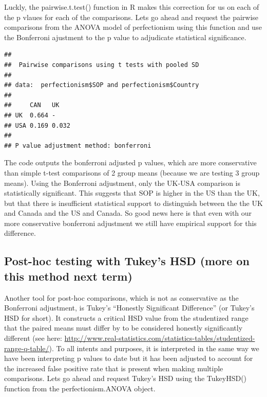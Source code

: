 \documentclass[
]{article}
\newenvironment{Shaded}{\begin{snugshade}}{\end{snugshade}}
\newcommand{\AttributeTok}[1]{\textcolor[rgb]{0.13,0.29,0.53}{#1}}
\newcommand{\CommentTok}[1]{\textcolor[rgb]{0.56,0.35,0.01}{\textit{#1}}}
\newcommand{\FunctionTok}[1]{\textcolor[rgb]{0.13,0.29,0.53}{\textbf{#1}}}
\newcommand{\NormalTok}[1]{#1}
\newcommand{\SpecialCharTok}[1]{\textcolor[rgb]{0.81,0.36,0.00}{\textbf{#1}}}
\newcommand{\StringTok}[1]{\textcolor[rgb]{0.31,0.60,0.02}{#1}}
\begin{document}
Luckly, the pairwise.t.test() function in R makes this correction for us
on each of the p vlaues for each of the comparisons. Lets go ahead and
request the pairwise comparisons from the ANOVA model of perfectionism
using this function and use the Bonferroni ajustment to the p value to
adjudicate statistical significance.

\begin{Shaded}
\end{Shaded}

\begin{verbatim}
## 
##  Pairwise comparisons using t tests with pooled SD 
## 
## data:  perfectionism$SOP and perfectionism$Country 
## 
##     CAN   UK   
## UK  0.664 -    
## USA 0.169 0.032
## 
## P value adjustment method: bonferroni
\end{verbatim}

The code outputs the bonferroni adjusted p values, which are more
conservative than simple t-test comparisons of 2 group means (because we
are testing 3 group means). Using the Bonferroni adjustment, only the
UK-USA comparison is statistically significant. This suggests that SOP
is higher in the US than the UK, but that there is insufficient
statistical support to distinguish between the the UK and Canada and the
US and Canada. So good news here is that even with our more conservative
bonferroni adjustment we still have empirical support for this
difference.

\subsection{Post-hoc testing with Tukey's HSD (more on this method next
term)}\label{post-hoc-testing-with-tukeys-hsd-more-on-this-method-next-term}

Another tool for post-hoc comparisons, which is not as conservative as
the Bonferroni adjustment, is Tukey's ``Honestly Significant
Difference'' (or Tukey's HSD for short). It constructs a critical HSD
value from the studentized range that the paired means must differ by to
be considered honestly significantly different (see here:
\url{http://www.real-statistics.com/statistics-tables/studentized-range-q-table/}).
To all intents and purposes, it is interpreted in the same way we have
been interpreting p values to date but it has been adjusted to account
for the increased false positive rate that is present when making
multiple comparisons. Lets go ahead and request Tukey's HSD using the
TukeyHSD() function from the perfectionism.ANOVA object.
\end{document}
